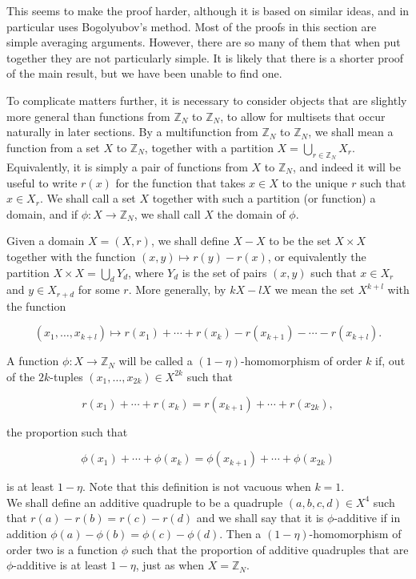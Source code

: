 \documentclass[10pt]{article}
\begin{document}
This seems to make the proof harder, although it is based on similar ideas, and in particular uses Bogolyubov's method. Most of the proofs in this section are simple averaging arguments. However, there are so many of them that when put together they are not particularly simple. It is likely that there is a shorter proof of the main result, but we have been unable to find one.

To complicate matters further, it is necessary to consider objects that are slightly more general than functions from $\mathbb{Z}_{N}$ to $\mathbb{Z}_{N}$, to allow for multisets that occur naturally in later sections. By a multifunction from $\mathbb{Z}_{N}$ to $\mathbb{Z}_{N}$, we shall mean a function from a set $X$ to $\mathbb{Z}_{N}$, together with a partition $X=\bigcup_{r \in \mathbb{Z}_{N}} X_{r}$. Equivalently, it is simply a pair of functions from $X$ to $\mathbb{Z}_{N}$, and indeed it will be useful to write $r(x)$ for the function that takes $x \in X$ to the unique $r$ such that $x \in X_{r}$. We shall call a set $X$ together with such a partition (or function) a domain, and if $\phi: X \rightarrow \mathbb{Z}_{N}$, we shall call $X$ the domain of $\phi$.

Given a domain $X=(X, r)$, we shall define $X-X$ to be the set $X \times X$ together with the function $(x, y) \mapsto r(y)-r(x)$, or equivalently the partition $X \times X=\bigcup_{d} Y_{d}$, where $Y_{d}$ is the set of pairs $(x, y)$ such that $x \in X_{r}$ and $y \in X_{r+d}$ for some $r$. More generally, by $k X-l X$ we mean the set $X^{k+l}$ with the function

$$
\left(x_{1}, \ldots, x_{k+l}\right) \mapsto r\left(x_{1}\right)+\cdots+r\left(x_{k}\right)-r\left(x_{k+1}\right)-\cdots-r\left(x_{k+l}\right) .
$$

A function $\phi: X \rightarrow \mathbb{Z}_{N}$ will be called a $(1-\eta)$-homomorphism of order $k$ if, out of the $2 k$-tuples $\left(x_{1}, \ldots, x_{2 k}\right) \in X^{2 k}$ such that

$$
r\left(x_{1}\right)+\cdots+r\left(x_{k}\right)=r\left(x_{k+1}\right)+\cdots+r\left(x_{2 k}\right),
$$

the proportion such that

$$
\phi\left(x_{1}\right)+\cdots+\phi\left(x_{k}\right)=\phi\left(x_{k+1}\right)+\cdots+\phi\left(x_{2 k}\right)
$$

is at least $1-\eta$. Note that this definition is not vacuous when $k=1$.\\
We shall define an additive quadruple to be a quadruple $(a, b, c, d) \in X^{4}$ such that $r(a)-r(b)=r(c)-r(d)$ and we shall say that it is $\phi$-additive if in addition $\phi(a)-\phi(b)=\phi(c)-\phi(d)$. Then a $(1-\eta)$-homomorphism of order two is a function $\phi$ such that the proportion of additive quadruples that are $\phi$-additive is at least $1-\eta$, just as when $X=\mathbb{Z}_{N}$.
\end{document}
